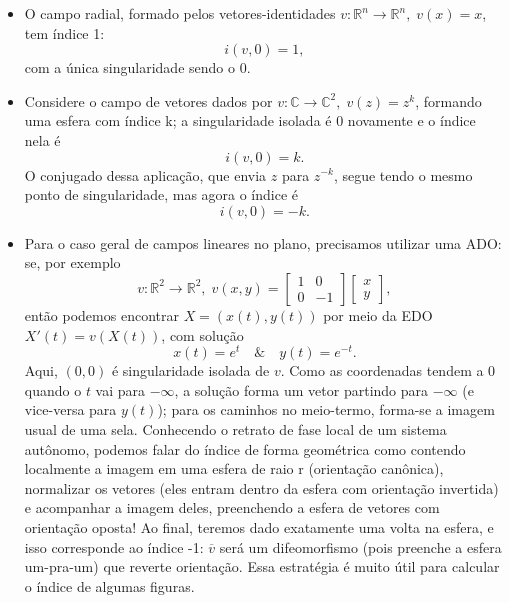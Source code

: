\documentclass[../differential_topology.tex]{subfiles}
\begin{document}
\begin{example}
	\begin{itemize}
		\item[i)] O campo radial, formado pelos vetores-identidades \(v:\mathbb{R}^{n}\rightarrow \mathbb{R}^{n},\; v(x) = x\), tem índice 1:
		      \[
			      i(v, 0) = 1,
		      \]
		      com a única singularidade sendo o 0.

		\item[2)] Considere o campo de vetores dados por \(v:\mathbb{C}\rightarrow \mathbb{C}^{2},\; v(z) = z^{k}\), formando uma esfera com índice k; a singularidade isolada é \(0\) novamente e o índice nela é
		      \[
			      i(v, 0) = k.
		      \]
		      O conjugado dessa aplicação, que envia \(z\) para \(z^{-k}\), segue tendo o mesmo ponto de singularidade, mas agora o índice é
		      \[
			      i(v, 0) = -k.
		      \]
		\item[3)] Para o caso geral de campos lineares no plano, precisamos utilizar uma ADO: se, por exemplo
		      \[
			      v:\mathbb{R}^{2}\rightarrow \mathbb{R}^{2},\; v(x, y) = \begin{bmatrix}
				      1 & 0  \\
				      0 & -1
			      \end{bmatrix} \begin{bmatrix}
				      x \\
				      y
			      \end{bmatrix},
		      \]
		      então podemos encontrar \(X = (x(t),y(t))\) por meio da EDO \(X'(t) = v(X(t))\), com solução
		      \[
			      x(t) = e^{t} \quad\&\quad y(t) = e^{-t}.
		      \]
		      Aqui, \((0, 0)\) é singularidade isolada de \(v\). Como as coordenadas tendem a 0 quando o \(t\) vai para \(-\infty\), a solução forma um vetor partindo para \(-\infty\) (e vice-versa para \(y(t)\)); para os caminhos no meio-termo, forma-se a imagem usual de uma sela.
		      Conhecendo o retrato de fase local de um sistema autônomo, podemos falar do índice de forma geométrica como contendo localmente a imagem em uma esfera de raio r (orientação canônica), normalizar os vetores (eles entram dentro da esfera com orientação invertida) e acompanhar a imagem deles, preenchendo a esfera de vetores com orientação oposta! Ao final, teremos dado exatamente uma volta na esfera, e isso corresponde ao índice -1: \(\overline{v}\) será um difeomorfismo (pois preenche a esfera um-pra-um) que reverte orientação.
		      Essa estratégia é muito útil para calcular o índice de algumas figuras.
	\end{itemize}
\end{example}
\end{document}
